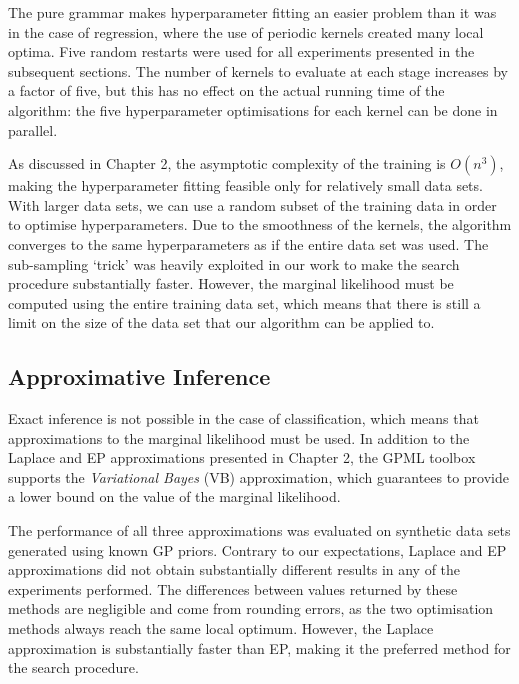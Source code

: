 \documentclass[a4paper,12pt ]{report}
\begin{document}
The pure {\SE} grammar makes hyperparameter fitting an easier problem than it was in the case of regression, where the use of periodic kernels created many local optima. Five random restarts were used for all experiments presented in the subsequent sections. The number of kernels to evaluate at each stage increases by a factor of five, but this has no effect on the actual running time of the algorithm: the five hyperparameter optimisations for each kernel can be done in parallel.

As discussed in Chapter 2, the asymptotic complexity of the training is $O(n^3)$, making the hyperparameter fitting feasible only for relatively small data sets. With larger data sets, we can use a random subset of the training data in order to optimise hyperparameters. Due to the smoothness of the {\SE} kernels, the algorithm converges to the same hyperparameters as if the entire data set was used. The sub-sampling `trick' was heavily exploited in our work to make the search procedure substantially faster. However, the marginal likelihood must be computed using the entire training data set, which means that there is still a limit on the size of the data set that our algorithm can be applied to.


\subsection{Approximative Inference}

Exact inference is not possible in the case of classification, which means that approximations to the marginal likelihood must be used. In addition to the Laplace and EP approximations presented in Chapter 2, the GPML toolbox supports the \emph{Variational Bayes} (VB) approximation, which guarantees to provide a lower bound on the value of the marginal likelihood.

The performance of all three approximations was evaluated on synthetic data sets generated using known GP priors. Contrary to our expectations, Laplace and EP approximations did not obtain substantially different results in any of the experiments performed. The differences between values returned by these methods are negligible and come from rounding errors, as the two optimisation methods always reach the same local optimum. However, the Laplace approximation is substantially faster than EP, making it the preferred method for the search procedure.
\end{document}
